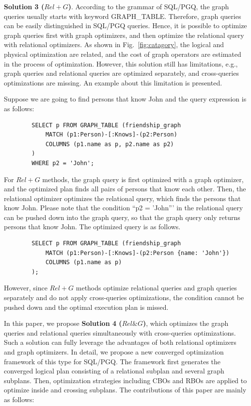 \textbf{Solution 3 ($Rel+G$)}.
According to the grammar of SQL/PGQ, the graph queries usually starts with keyword GRAPH\_TABLE.
Therefore, graph queries can be easily distinguished in SQL/PGQ queries.
Hence, it is possible to optimize graph queries first with graph optimizers, and then optimize the relational query with relational optimizers.
As shown in Fig.~\ref{fig:catagory}, the logical and physical optimization are related, and the cost of graph operators are estimated in the process of optimization.
However, this solution still has limitations, e.g., graph queries and relational queries are optimized separately, and cross-queries optimizations are missing.
An example about this limitation is presented.

\begin{example}
    \label{example:push_down}
    Suppose we are going to find persons that know John and the query expression is as follows:
    \begin{lstlisting}
        SELECT p FROM GRAPH_TABLE (friendship_graph 
            MATCH (p1:Person)-[:Knows]-(p2:Person)
            COLUMNS (p1.name as p, p2.name as p2)
        )
        WHERE p2 = 'John';
    \end{lstlisting}
    For $Rel+G$ methods, the graph query is first optimized with a graph optimizer, and the optimized plan finds all pairs of persons that know each other.
    Then, the relational optimizer optimizes the relational query, which finds the persons that know John.
    Please note that the condition ``p2 = 'John''' in the relational query can be pushed down into the graph query, so that the graph query only returns persons that know John.
    The optimized query is as follows.
    \begin{lstlisting}
        SELECT p FROM GRAPH_TABLE (friendship_graph 
            MATCH (p1:Person)-[:Knows]-(p2:Person {name: 'John'})
            COLUMNS (p1.name as p)
        );
    \end{lstlisting}
    However, since $Rel+G$ methods optimize relational queries and graph queries separately and do not apply cross-queries optimizations, the condition cannot be pushed down and the optimal execution plan is missed.
\end{example}

In this paper, we propose \textbf{Solution 4 ($Rel\&G$)}, which optimizes the graph queries and relational queries simultaneously with cross-queries optimizations.
Such a solution can fully leverage the advantages of both relational optimizers and graph optimizers.
In detail, we propose a new converged optimization framework of this type for SQL/PGQ.
The framework first generates the converged logical plan consisting of a relational subplan and several graph subplans.
Then, optimization strategies including CBOs and RBOs are applied to optimize inside and crossing subplans.
The contributions of this paper are mainly as follows:

